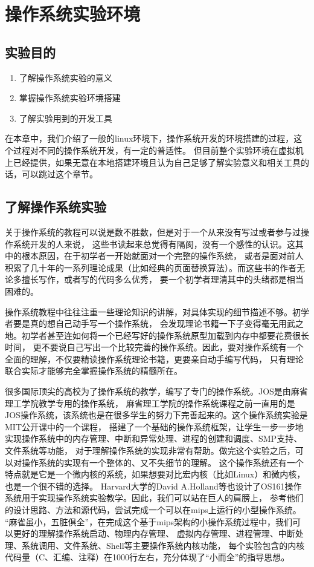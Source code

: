 \chapter{操作系统实验环境}

\section{实验目的}
  \begin{enumerate}
    \item 了解操作系统实验的意义
    \item 掌握操作系统实验环境搭建
    \item 了解实验用到的开发工具
  \end{enumerate}
在本章中，我们介绍了一般的linux环境下，操作系统开发的环境搭建的过程，这个过程对不同的操作系统开发，有一定的普适性。
但目前整个实验环境在虚拟机上已经提供，如果无意在本地搭建环境且认为自己足够了解实验意义和相关工具的话，可以跳过这个章节。
    
\section{了解操作系统实验}
关于操作系统的教程可以说是数不胜数，但是对于一个从来没有写过或者参与过操作系统开发的人来说，
这些书读起来总觉得有隔阂，没有一个感性的认识。这其中的根本原因，在于初学者一开始就面对一个完整的操作系统，
或者是面对前人积累了几十年的一系列理论成果（比如经典的页面替换算法）。而这些书的作者无论多擅长写作，或者写的代码多么优秀，
要一个初学者理清其中的头绪都是相当困难的。

操作系统教程中往往注重一些理论知识的讲解，对具体实现的细节描述不够。初学者要是真的想自己动手写一个操作系统，
会发现理论书籍一下子变得毫无用武之地。初学者甚至连如何将一个已经写好的操作系统原型加载到内存中都要花费很长时间，
更不要说自己写出一个比较完善的操作系统。因此，要对操作系统有一个全面的理解，不仅要精读操作系统理论书籍，更要亲自动手编写代码，
只有理论联合实际才能够完全掌握操作系统的精髓所在。

很多国际顶尖的高校为了操作系统的教学，编写了专门的操作系统。JOS是由麻省理工学院教学专用的操作系统，
麻省理工学院的操作系统课程之前一直用的是JOS操作系统，该系统也是在很多学生的努力下完善起来的。这个操作系统实验是MIT公开课中的一个课程，
搭建了一个基础的操作系统框架，让学生一步一步地实现操作系统中的内存管理、中断和异常处理、进程的创建和调度、SMP支持、文件系统等功能，
对于理解操作系统的实现非常有帮助。做完这个实验之后，可以对操作系统的实现有一个整体的、又不失细节的理解。
这个操作系统还有一个特点就是它是一个微内核的系统，如果想要对比宏内核（比如Linux）和微内核，也是一个很不错的选择。
Harvard大学的David A.Holland等也设计了OS161操作系统用于实现操作系统实验教学。因此，我们可以站在巨人的肩膀上，
参考他们的设计思路、方法和源代码，尝试完成一个可以在mips上运行的小型操作系统。
“麻雀虽小，五脏俱全”，在完成这个基于mips架构的小操作系统过程中，我们可以更好的理解操作系统启动、物理内存管理、
虚拟内存管理、进程管理、中断处理、系统调用、文件系统、Shell等主要操作系统内核功能，
每个实验包含的内核代码量（C、汇编、注释）在1000行左右，充分体现了“小而全”的指导思想。

